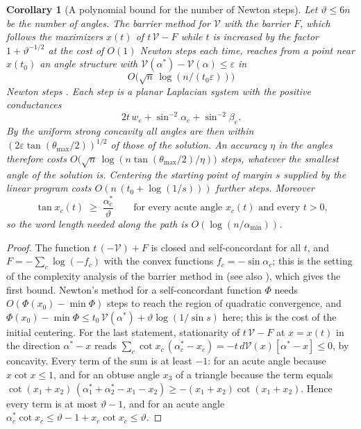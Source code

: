 \documentclass[11pt]{amsart}
\newtheorem{corollary}[theorem]{Corollary}
\theoremstyle{definition}
\theoremstyle{remark}
\newcommand{\eps}{\varepsilon}
\begin{document}
\begin{corollary}[A polynomial bound for the number of Newton steps]\label{cor:poly}
Let $\vartheta\le6n$ be the number of angles. The barrier method for $\mathcal V$ with the barrier $F$, which follows the maximizers $x(t)$ of $t\,\mathcal V-F$ while $t$ is increased by the factor $1+\vartheta^{-1/2}$ at the cost of $O(1)$ Newton steps each time,
reaches from a point near $x(t_0)$ an angle structure with $\mathcal V(\alpha^*)-\mathcal V(\alpha)\le\eps$ in
\[
O\bigl(\sqrt n\,\log(n/(t_0\eps))\bigr)
\]
Newton steps \cite{NN94,BV04}. Each step is a planar Laplacian system with the positive conductances
\[
2t\,w_e+\sin^{-2}\alpha_e+\sin^{-2}\beta_e .
\]
By the uniform strong concavity all angles are then within $(2\eps\tan(\theta_{\max}/2))^{1/2}$ of those of the solution. An accuracy $\eta$ in the angles therefore costs
$O\bigl(\sqrt n\,\log(n\tan(\theta_{\max}/2)/\eta)\bigr)$ steps, whatever the smallest angle of the solution is. Centering the starting point of margin $s$ supplied by the linear program costs $O(n\,(t_0+\log(1/s)))$ further steps. Moreover
\[
\tan x_c(t)\;\ge\;\frac{\alpha_c^*}{\vartheta}\qquad\text{for every acute angle $x_c(t)$ and every $t>0$,}
\]
so the word length needed along the path is $O(\log(n/\alpha_{\min}))$.
\end{corollary}

\begin{proof}
The function $t\,(-\mathcal V)+F$ is closed and self-concordant for all $t$, and $F=-\sum_c\log(-f_c)$ with the convex functions $f_c=-\sin\alpha_c$; this is the setting of the complexity analysis of the barrier method in \cite[Section~11.5]{BV04} (see also \cite{NN94}), which gives the first bound.
Newton's method for a self-concordant function $\Phi$ needs $O(\Phi(x_0)-\min\Phi)$ steps to reach the region of quadratic convergence, and $\Phi(x_0)-\min\Phi\le t_0\,\mathcal V(\alpha^*)+\vartheta\log(1/\sin s)$ here; this is the cost of the initial centering.
For the last statement, stationarity of $t\,\mathcal V-F$ at $x=x(t)$ in the direction $\alpha^*-x$ reads $\sum_c\cot x_c\,(\alpha_c^*-x_c)=-t\,d\mathcal V(x)[\alpha^*-x]\le0$, by concavity.
Every term of the sum is at least $-1$: for an acute angle because $x\cot x\le1$, and for an obtuse angle $x_3$ of a triangle because the term equals $\cot(x_1+x_2)\,(\alpha^*_1+\alpha^*_2-x_1-x_2)\ge-(x_1+x_2)\cot(x_1+x_2)$.
Hence every term is at most $\vartheta-1$, and for an acute angle $\alpha^*_c\cot x_c\le\vartheta-1+x_c\cot x_c\le\vartheta$.
\end{proof}
\end{document}
